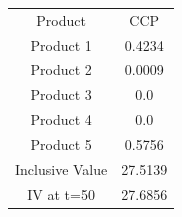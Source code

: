 \begin{tabular}{cc}
Product & CCP \\
Product 1 & 0.4234 \\
Product 2 & 0.0009 \\
Product 3 & 0.0 \\
Product 4 & 0.0 \\
Product 5 & 0.5756 \\
Inclusive Value & 27.5139 \\
IV at t=50 & 27.6856 \\
\end{tabular}